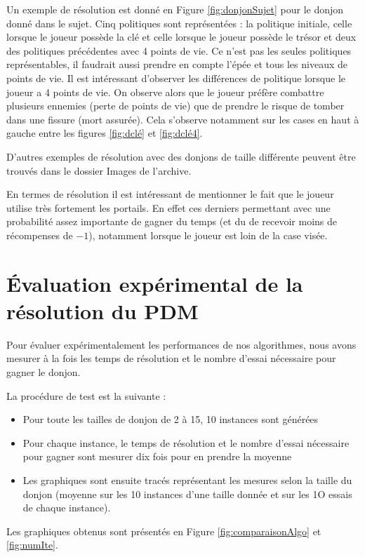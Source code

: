 \documentclass[a4paper]{article}
\theoremstyle{plain}
\begin{document}
Un exemple de résolution est donné en Figure \ref{fig:donjonSujet} pour le donjon donné dans le sujet. Cinq politiques sont représentées : la politique initiale, celle lorsque le joueur possède la clé et celle lorsque le joueur possède le trésor et deux des politiques précédentes avec 4 points de vie. Ce n'est pas les seules politiques représentables, il faudrait aussi prendre en compte l'épée et tous les niveaux de points de vie. Il est intéressant d'observer les différences de politique lorsque le joueur a 4 points de vie. On observe alors que le joueur préfère combattre plusieurs ennemies (perte de points de vie) que de prendre le risque de tomber dans une fissure (mort assurée). Cela s'observe notamment sur les cases en haut à gauche entre les figures \ref{fig:dclé} et \ref{fig:dclé4}.

D'autres exemples de résolution avec des donjons de taille différente peuvent être trouvés dans le dossier Images de l'archive.

En termes de résolution il est intéressant de mentionner le fait que le joueur utilise très fortement les portails. En effet ces derniers permettant avec une probabilité assez importante de gagner du temps (et du de recevoir moins de récompenses de $-1$), notamment lorsque le joueur est loin de la case visée.

\section{Évaluation expérimental de la résolution du PDM}

Pour évaluer expérimentalement les performances de nos algorithmes, nous avons mesurer à la fois les temps de résolution et le nombre d'essai nécessaire pour gagner le donjon.

La procédure de test est la suivante :
\begin{itemize}
	\item Pour toute les tailles de donjon de 2 à 15, 10 instances sont générées
	\item Pour chaque instance, le temps de résolution et le nombre d'essai nécessaire pour gagner sont mesurer dix fois pour en prendre la moyenne
	\item Les graphiques sont ensuite tracés représentant les mesures selon la taille du donjon (moyenne sur les 10 instances d'une taille donnée et sur les 1O essais de chaque instance).
\end{itemize}

Les graphiques obtenus sont présentés en Figure \ref{fig:comparaisonAlgo} et \ref{fig:numIte}. 
\end{document}
